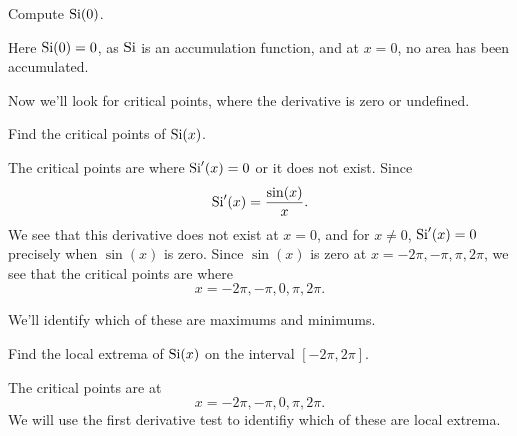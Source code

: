 \documentclass{ximera}
\begin{document}
\begin{example}
  Compute $\operatorname{Si}(0)$.
  \begin{explanation}
    Here $\operatorname{Si}(0)=0$, as $\operatorname{Si}$ is an accumulation
    function, and at $x=0$, no area has been accumulated.
  \end{explanation}
\end{example}



Now we'll look for critical points, where the derivative is zero or
undefined.

\begin{example}
  Find the critical points of $\operatorname{Si}(x)$.
  \begin{explanation}
    The critical points are where $\operatorname{Si}'(x)= 0$ or it does not exist.
    Since
    \[
    \operatorname{Si}'(x) = \frac{\sin(x)}{x}.
    \]
    We see that this derivative does not exist at $x=0$, and for $x\ne
    0$, $\operatorname{Si}'(x)=0$ precisely when $\sin(x)$ is zero. Since $\sin(x)$
    is zero at $x = -2\pi, -\pi, \pi, 2\pi$, we see that the critical
    points are where
    \[
    x= -2\pi, -\pi,0, \pi, 2\pi.
    \]
  \end{explanation}
\end{example}

We'll identify which of these are maximums and minimums.

\begin{example}
  Find the local extrema of $\operatorname{Si}(x)$ on the interval $[-2\pi,2\pi]$.
  \begin{explanation}
    The critical points are at
    \[
    x= -2\pi, -\pi,0, \pi, 2\pi.
    \]
    We will use the first derivative test to identifiy which of these
    are local extrema.
    
  \end{explanation}
\end{example}
\end{document}
